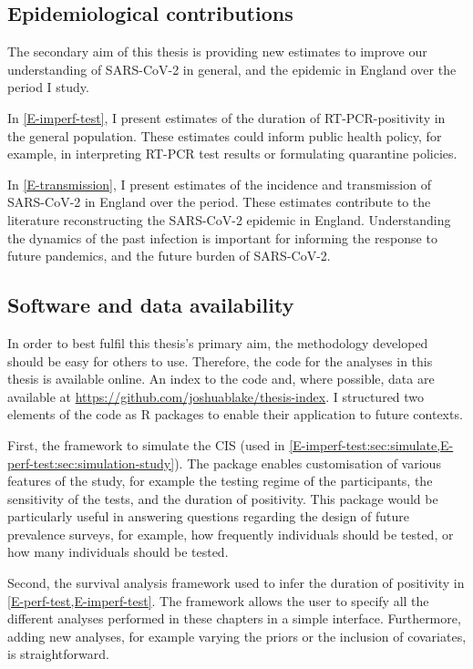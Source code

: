 \documentclass[thesis.tex]{subfiles}
\begin{document}
\subsection{Epidemiological contributions}

The secondary aim of this thesis is providing new estimates to improve our understanding of SARS-CoV-2 in general, and the epidemic in England over the period I study.

In \cref{E-imperf-test}, I present estimates of the duration of RT-PCR-positivity in the general population.
These estimates could inform public health policy, for example, in interpreting RT-PCR test results or formulating quarantine policies.

In \cref{E-transmission}, I present estimates of the incidence and transmission of SARS-CoV-2 in England over the period.
These estimates contribute to the literature reconstructing the SARS-CoV-2 epidemic in England.
Understanding the dynamics of the past infection is important for informing the response to future pandemics, and the future burden of SARS-CoV-2.

\subsection{Software and data availability}

In order to best fulfil this thesis's primary aim, the methodology developed should be easy for others to use.
Therefore, the code for the analyses in this thesis is available online.
An index to the code and, where possible, data are available at \url{https://github.com/joshuablake/thesis-index}.
I structured two elements of the code as R packages to enable their application to future contexts.

First, the framework to simulate the CIS (used in \cref{E-imperf-test:sec:simulate,E-perf-test:sec:simulation-study}).
The package enables customisation of various features of the study, for example the testing regime of the participants, the sensitivity of the tests, and the duration of positivity.
This package would be particularly useful in answering questions regarding the design of future prevalence surveys, for example, how frequently individuals should be tested, or how many individuals should be tested.

Second, the survival analysis framework used to infer the duration of positivity in \cref{E-perf-test,E-imperf-test}.
The framework allows the user to specify all the different analyses performed in these chapters in a simple interface. 
Furthermore, adding new analyses, for example varying the priors or the inclusion of covariates, is straightforward.
\end{document}
